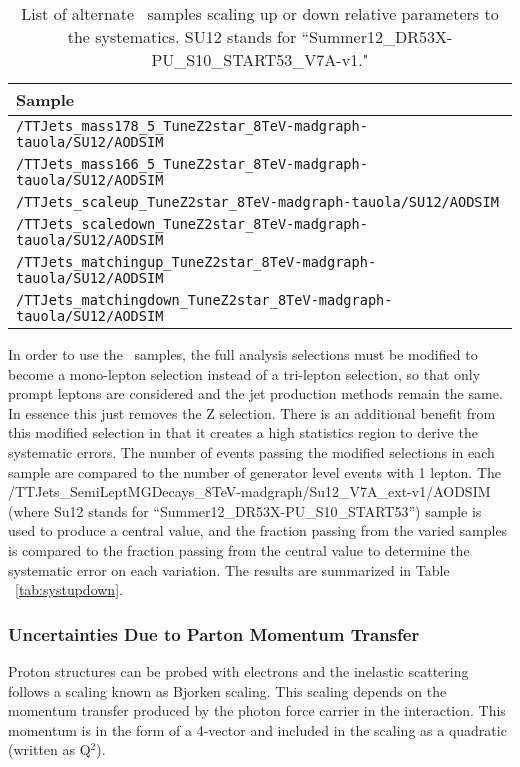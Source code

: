 \begin{table}[h]
\begin{center}

\begin{tabular}{l}\hline
Sample   \\ \hline
 \verb=/TTJets_mass178_5_TuneZ2star_8TeV-madgraph-tauola/SU12/AODSIM=   \\
 \verb=/TTJets_mass166_5_TuneZ2star_8TeV-madgraph-tauola/SU12/AODSIM=   \\  %
 \verb=/TTJets_scaleup_TuneZ2star_8TeV-madgraph-tauola/SU12/AODSIM=  \\
 \verb=/TTJets_scaledown_TuneZ2star_8TeV-madgraph-tauola/SU12/AODSIM=  \\ %
 \verb=/TTJets_matchingup_TuneZ2star_8TeV-madgraph-tauola/SU12/AODSIM=  \\
 \verb=/TTJets_matchingdown_TuneZ2star_8TeV-madgraph-tauola/SU12/AODSIM=  \\
\hline
\end{tabular}
\caption{\label{tab:sampleupdown} List of alternate \ttbar \ samples scaling up or down relative parameters to the systematics. SU12 stands for ``Summer12\_DR53X-PU\_S10\_START53\_V7A-v1."}
\end{center}
\end{table}

In order to use the \ttbar \ samples, the full analysis selections must be modified to become a mono-lepton selection instead of a tri-lepton selection, so that only prompt leptons are considered and the jet production methods remain the same. In essence this just removes the Z selection. There is an additional benefit from this modified selection in that it creates a high statistics region to derive the systematic errors. The number of events passing the modified selections in each sample are compared to the number of generator level events with 1 lepton. The /TTJets\_SemiLeptMGDecays\_8TeV-madgraph/Su12\_V7A\_ext-v1/AODSIM  (where Su12 stands for ``Summer12\_DR53X-PU\_S10\_START53'') sample is used to produce a central value, and the fraction passing from the varied samples is compared to the fraction passing from the central value to determine the systematic error on each variation. The results are summarized in Table ~\ref{tab:systupdown}.

\subsubsection{Uncertainties Due to Parton Momentum Transfer}
Proton structures can be probed with electrons and the inelastic scattering follows a scaling known as Bjorken scaling. This scaling depends on the momentum transfer produced by the photon force carrier in the interaction. This momentum is in the form of a 4-vector and included in the scaling as a quadratic (written as Q$^2$).\\

